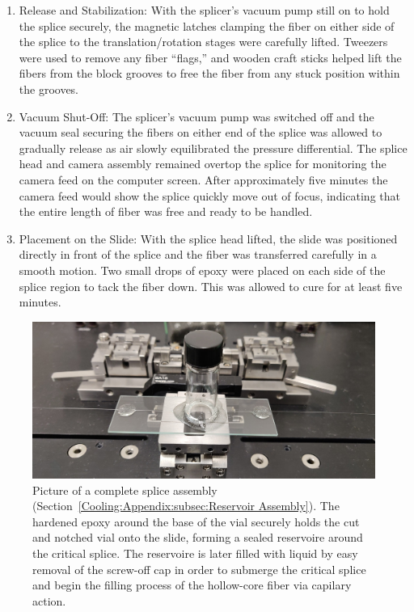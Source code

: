 \begin{enumerate}
	\item Release and Stabilization: With the splicer’s vacuum pump still on to hold the splice securely, the magnetic latches clamping the fiber on either side of the splice to the translation/rotation stages were carefully lifted. Tweezers were used to remove any fiber “flags,” and wooden craft sticks helped lift the fibers from the block grooves to free the fiber from any stuck position within the grooves.
  \item Vacuum Shut-Off: The splicer's vacuum pump was switched off and the vacuum seal securing the fibers on either end of the splice was allowed to gradually release as air slowly equilibrated the pressure differential. The splice head and camera assembly remained overtop the splice for monitoring the camera feed on the computer screen. After approximately five minutes the camera feed would show the splice quickly move out of focus, indicating that the entire length of fiber was free and ready to be handled.
	\item Placement on the Slide: With the splice head lifted, the slide was positioned directly in front of the splice and the fiber was transferred carefully in a smooth motion. Two small drops of epoxy were placed on each side of the splice region to tack the fiber down. This was allowed to cure for at least five minutes.
\end{enumerate}

\begin{figure}[t]
  \centering
  \includegraphics[width=\textwidth]{figs/3-Cooling/successfullyBuiltSplice.jpg}
  \caption{Picture of a complete splice assembly (Section~\ref{Cooling:Appendix:subsec:Reservoir Assembly}). The hardened epoxy around the base of the vial securely holds the cut and notched vial onto the slide, forming a sealed reservoire around the critical splice. The reservoire is later filled with liquid  by easy removal of the screw-off cap in order to submerge the critical splice and begin the filling process of the hollow-core fiber via capilary action.}
  \label{fig:successfully build splice}
\end{figure}

